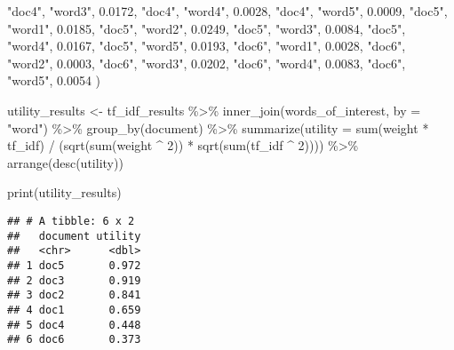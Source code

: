\documentclass[
]{book}
\newenvironment{Shaded}{\begin{snugshade}}{\end{snugshade}}
\newcommand{\AttributeTok}[1]{\textcolor[rgb]{0.77,0.63,0.00}{#1}}
\newcommand{\DecValTok}[1]{\textcolor[rgb]{0.00,0.00,0.81}{#1}}
\newcommand{\FloatTok}[1]{\textcolor[rgb]{0.00,0.00,0.81}{#1}}
\newcommand{\FunctionTok}[1]{\textcolor[rgb]{0.00,0.00,0.00}{#1}}
\newcommand{\NormalTok}[1]{#1}
\newcommand{\OtherTok}[1]{\textcolor[rgb]{0.56,0.35,0.01}{#1}}
\newcommand{\SpecialCharTok}[1]{\textcolor[rgb]{0.00,0.00,0.00}{#1}}
\newcommand{\StringTok}[1]{\textcolor[rgb]{0.31,0.60,0.02}{#1}}
\begin{document}
\begin{Shaded}
\begin{Highlighting}[]
  \StringTok{"doc4"}\NormalTok{, }\StringTok{"word3"}\NormalTok{, }\FloatTok{0.0172}\NormalTok{,}
  \StringTok{"doc4"}\NormalTok{, }\StringTok{"word4"}\NormalTok{, }\FloatTok{0.0028}\NormalTok{,}
  \StringTok{"doc4"}\NormalTok{, }\StringTok{"word5"}\NormalTok{, }\FloatTok{0.0009}\NormalTok{,}
  \StringTok{"doc5"}\NormalTok{, }\StringTok{"word1"}\NormalTok{, }\FloatTok{0.0185}\NormalTok{,}
  \StringTok{"doc5"}\NormalTok{, }\StringTok{"word2"}\NormalTok{, }\FloatTok{0.0249}\NormalTok{,}
  \StringTok{"doc5"}\NormalTok{, }\StringTok{"word3"}\NormalTok{, }\FloatTok{0.0084}\NormalTok{,}
  \StringTok{"doc5"}\NormalTok{, }\StringTok{"word4"}\NormalTok{, }\FloatTok{0.0167}\NormalTok{,}
  \StringTok{"doc5"}\NormalTok{, }\StringTok{"word5"}\NormalTok{, }\FloatTok{0.0193}\NormalTok{,}
  \StringTok{"doc6"}\NormalTok{, }\StringTok{"word1"}\NormalTok{, }\FloatTok{0.0028}\NormalTok{,}
  \StringTok{"doc6"}\NormalTok{, }\StringTok{"word2"}\NormalTok{, }\FloatTok{0.0003}\NormalTok{,}
  \StringTok{"doc6"}\NormalTok{, }\StringTok{"word3"}\NormalTok{, }\FloatTok{0.0202}\NormalTok{,}
  \StringTok{"doc6"}\NormalTok{, }\StringTok{"word4"}\NormalTok{, }\FloatTok{0.0083}\NormalTok{,}
  \StringTok{"doc6"}\NormalTok{, }\StringTok{"word5"}\NormalTok{, }\FloatTok{0.0054}
\NormalTok{)}

\NormalTok{utility\_results }\OtherTok{\textless{}{-}}\NormalTok{ tf\_idf\_results }\SpecialCharTok{\%\textgreater{}\%}
  \FunctionTok{inner\_join}\NormalTok{(words\_of\_interest, }\AttributeTok{by =} \StringTok{"word"}\NormalTok{) }\SpecialCharTok{\%\textgreater{}\%}
  \FunctionTok{group\_by}\NormalTok{(document) }\SpecialCharTok{\%\textgreater{}\%}
  \FunctionTok{summarize}\NormalTok{(}\AttributeTok{utility =} \FunctionTok{sum}\NormalTok{(weight }\SpecialCharTok{*}\NormalTok{ tf\_idf) }\SpecialCharTok{/} 
\NormalTok{              (}\FunctionTok{sqrt}\NormalTok{(}\FunctionTok{sum}\NormalTok{(weight }\SpecialCharTok{\^{}} \DecValTok{2}\NormalTok{)) }\SpecialCharTok{*} \FunctionTok{sqrt}\NormalTok{(}\FunctionTok{sum}\NormalTok{(tf\_idf }\SpecialCharTok{\^{}} \DecValTok{2}\NormalTok{)))) }\SpecialCharTok{\%\textgreater{}\%}
  \FunctionTok{arrange}\NormalTok{(}\FunctionTok{desc}\NormalTok{(utility))}

\FunctionTok{print}\NormalTok{(utility\_results)}
\end{Highlighting}
\end{Shaded}

\begin{verbatim}
## # A tibble: 6 x 2
##   document utility
##   <chr>      <dbl>
## 1 doc5       0.972
## 2 doc3       0.919
## 3 doc2       0.841
## 4 doc1       0.659
## 5 doc4       0.448
## 6 doc6       0.373
\end{verbatim}
\end{document}

